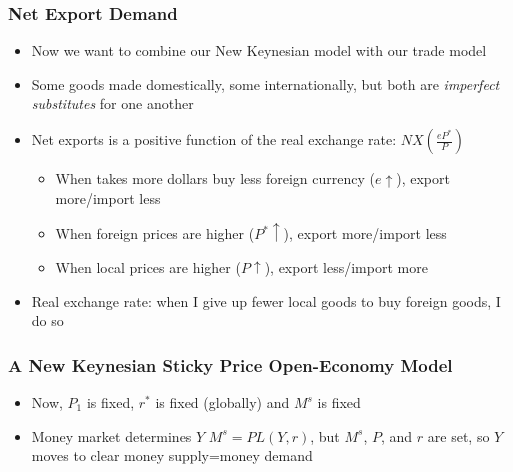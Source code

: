 \documentclass{beamer}
\begin{document}
\begin{frame}
\frametitle[alignment=center]{Net Export Demand}
\begin{itemize}
\item Now we want to combine our New Keynesian model with our trade model
\bigskip
\item Some goods made domestically, some internationally, but both are \emph{imperfect substitutes} for one another
\bigskip
\item Net exports is a positive function of the real exchange rate: $NX\left(\frac{eP^*}{P}\right)$
\begin{itemize}
\item When takes more dollars buy less foreign currency ($e\uparrow$), export more/import less
\bigskip
\item When foreign prices are higher  ($P^*\uparrow$), export more/import less
\bigskip
\item When local prices are higher ($P\uparrow$), export less/import more
\end{itemize}
\item Real exchange rate:  when I give up fewer local goods to buy foreign goods, I do so
\end{itemize}
\end{frame}

\begin{frame}
\frametitle[alignment=center]{A New Keynesian Sticky Price Open-Economy Model}
\begin{itemize}
\item Now, $P_1$ is fixed, $r^*$ is fixed (globally) and $M^s$ is fixed
\bigskip
\item Money market determines $Y$ $M^s=PL(Y,r)$, but $M^s$, $P$, and $r$ are set, so $Y$ moves to clear money supply=money demand
\end{itemize}
\end{frame}
\end{document}

